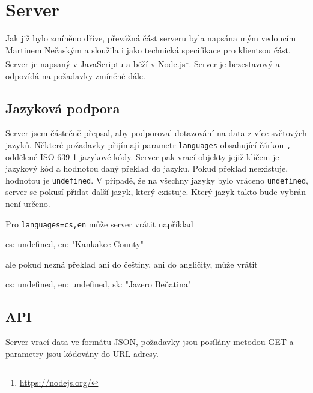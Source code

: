 \chapter{Server}
Jak již bylo zmíněno dříve, převážná část serveru byla napsána mým vedoucím Martinem Nečaským a sloužila i jako technická specifikace pro klientsou část. Server je napsaný v JavaScriptu a běží v Node.js\footnote{\url{https://nodejs.org/}}. Server je bezestavový a odpovídá na požadavky zmíněné dále.

\section{Jazyková podpora}
Server jsem částečně přepsal, aby podporoval dotazování na data z více světových jazyků. Některé požadavky přijímají parametr \texttt{languages} obsahující čárkou \texttt{,} oddělené ISO 639-1 jazykové kódy. Server pak vrací objekty jejiž klíčem je jazykový kód a hodnotou daný překlad do jazyku. Pokud překlad neexistuje, hodnotou je \texttt{undefined}. V případě, že na všechny jazyky bylo vráceno \texttt{undefined}, server se pokusí přidat další jazyk, který existuje. Který jazyk takto bude vybrán není určeno.

\begin{prikl}
Pro \texttt{languages=cs,en} může server vrátit například
\begin{code}[frame=none]
{
    cs: undefined,
    en: "Kankakee County"
}
\end{code}
ale pokud nezná překlad ani do češtiny, ani do angličity, může vrátit
\begin{code}[frame=none]
{
    cs: undefined,
    en: undefined,
    sk: "Jazero Beňatina"
}
\end{code}
\end{prikl}

\section{API}
Server vrací data ve formátu JSON, požadavky jsou posílány metodou GET a parametry jsou kódovány do URL adresy.

